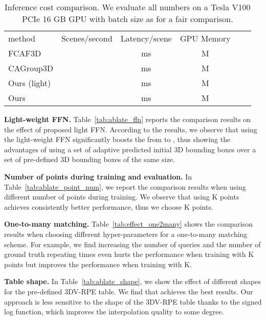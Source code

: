 \documentclass[10pt,twocolumn,letterpaper]{article}
\begin{document}
\begin{table}[t]
\begin{minipage}[t]{1\linewidth}
\vspace{-2mm}
\centering
\setlength{\tabcolsep}{5pt}
\footnotesize
{}
\resizebox{1.0\linewidth}{!}
{
\begin{tabular}{l|c|c|c|c|c}
method &  Scenes/second & Latency/scene & GPU Memory &  &  \\
\shline
FCAF3D &  & ms & M &   &    \\
CAGroup3D &  & ms & M &  &    \\
Ours (light) &   & ms & M &  &    \\
Ours &  & ms & M &  &    \\
\end{tabular}
}
\caption{\small
Inference cost comparison. We evaluate all numbers on a Tesla V100 PCIe 16 GB GPU with batch size as  for a fair comparison.
}
\label{tab:compare_inference}
\vspace{1mm}
\end{minipage}
\end{table}



\vspace{1mm}
\noindent \textbf{Light-weight FFN.}
Table~\ref{tab:ablate_ffn} reports the comparison results on the effect of proposed light FFN.
According to the results, we observe that using the light-weight FFN significantly boosts the  from  to , thus showing the advantages of using a set of adaptive predicted initial 3D bounding boxes over a set of pre-defined 3D bounding boxes of the same size.

\vspace{1mm}
\noindent \textbf{Number of points during training and evaluation.}
In Table~\ref{tab:ablate_point_num}, we report the comparison results when using different number of points during training. We observe that using K points achieves consistently better performance, thus we choose K points.


\vspace{1mm}
\noindent \textbf{One-to-many matching.}
Table~\ref{tab:effect_one2many} shows the comparison results when choosing different hyper-parameters for a one-to-many matching scheme.
For example, we find increasing the number of queries and the number of ground truth repeating times even hurts the performance when training with K points but improves the performance when training with K.


\vspace{1mm}
\noindent \textbf{Table shape.}
In Table~\ref{tab:ablate_shape}, we show the effect of different shapes for the pre-defined 3DV-RPE table. We find that  achieves the best results. Our approach is less sensitive to the shape of the 3DV-RPE table thanks to the signed log function, which improves the interpolation quality to some degree.
\end{document}
